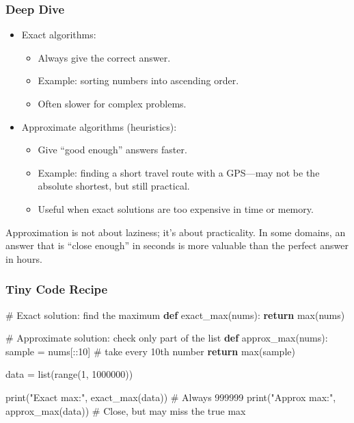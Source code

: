 \documentclass[
  letterpaper,
  DIV=11,
  numbers=noendperiod]{scrreprt}
\newenvironment{Shaded}{\begin{snugshade}}{\end{snugshade}}
\newcommand{\BuiltInTok}[1]{\textcolor[rgb]{0.00,0.23,0.31}{#1}}
\newcommand{\CommentTok}[1]{\textcolor[rgb]{0.37,0.37,0.37}{#1}}
\newcommand{\ControlFlowTok}[1]{\textcolor[rgb]{0.00,0.23,0.31}{\textbf{#1}}}
\newcommand{\DecValTok}[1]{\textcolor[rgb]{0.68,0.00,0.00}{#1}}
\newcommand{\KeywordTok}[1]{\textcolor[rgb]{0.00,0.23,0.31}{\textbf{#1}}}
\newcommand{\NormalTok}[1]{\textcolor[rgb]{0.00,0.23,0.31}{#1}}
\newcommand{\OperatorTok}[1]{\textcolor[rgb]{0.37,0.37,0.37}{#1}}
\newcommand{\StringTok}[1]{\textcolor[rgb]{0.13,0.47,0.30}{#1}}
\providecommand{\tightlist}{%
  \setlength{\itemsep}{0pt}\setlength{\parskip}{0pt}}
\begin{document}
\subsubsection{Deep Dive}\label{deep-dive-51}

\begin{itemize}
\item
  Exact algorithms:

  \begin{itemize}
  \tightlist
  \item
    Always give the correct answer.
  \item
    Example: sorting numbers into ascending order.
  \item
    Often slower for complex problems.
  \end{itemize}
\item
  Approximate algorithms (heuristics):

  \begin{itemize}
  \tightlist
  \item
    Give ``good enough'' answers faster.
  \item
    Example: finding a short travel route with a GPS---may not be the
    absolute shortest, but still practical.
  \item
    Useful when exact solutions are too expensive in time or memory.
  \end{itemize}
\end{itemize}

Approximation is not about laziness; it's about practicality. In some
domains, an answer that is ``close enough'' in seconds is more valuable
than the perfect answer in hours.

\subsubsection{Tiny Code Recipe}\label{tiny-code-recipe-79}

\begin{Shaded}
\begin{Highlighting}[]
\CommentTok{\# Exact solution: find the maximum}
\KeywordTok{def}\NormalTok{ exact\_max(nums):}
    \ControlFlowTok{return} \BuiltInTok{max}\NormalTok{(nums)}

\CommentTok{\# Approximate solution: check only part of the list}
\KeywordTok{def}\NormalTok{ approx\_max(nums):}
\NormalTok{    sample }\OperatorTok{=}\NormalTok{ nums[::}\DecValTok{10}\NormalTok{]  }\CommentTok{\# take every 10th number}
    \ControlFlowTok{return} \BuiltInTok{max}\NormalTok{(sample)}

\NormalTok{data }\OperatorTok{=} \BuiltInTok{list}\NormalTok{(}\BuiltInTok{range}\NormalTok{(}\DecValTok{1}\NormalTok{, }\DecValTok{1000000}\NormalTok{))}

\BuiltInTok{print}\NormalTok{(}\StringTok{"Exact max:"}\NormalTok{, exact\_max(data))      }\CommentTok{\# Always 999999}
\BuiltInTok{print}\NormalTok{(}\StringTok{"Approx max:"}\NormalTok{, approx\_max(data))    }\CommentTok{\# Close, but may miss the true max}
\end{Highlighting}
\end{Shaded}
\end{document}
